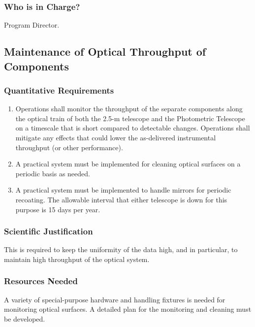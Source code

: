 \subsubsection{Who is in Charge?}

Program Director. 

\subsection{Maintenance of Optical Throughput of Components}

\subsubsection{Quantitative Requirements}

\begin{enumerate} 
\item Operations shall monitor the throughput of the separate 
components along the optical train of both the 2.5-m telescope and 
the Photometric Telescope on a timescale that is short compared to 
detectable changes.  Operations shall mitigate any effects that 
could lower the as-delivered instrumental throughput (or other 
performance). 

\item A practical system must be implemented for cleaning optical 
surfaces on a periodic basis as needed.

\item A practical system must be implemented to handle
mirrors for periodic recoating.  The allowable interval that either 
telescope is down for this purpose is 15 days per year. 
\end{enumerate}

\subsubsection{Scientific Justification}

This is required to keep the uniformity of the data high, and in
particular, to maintain high throughput of the optical system. 

\subsubsection{Resources Needed}

A variety of special-purpose hardware and handling fixtures is needed
for monitoring optical surfaces.    A detailed plan for the monitoring
and cleaning must be developed. 


